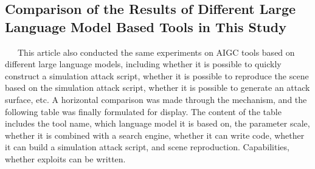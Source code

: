 \documentclass[runningheads]{llncs}
\begin{document}
\subsection{Comparison of the Results of Different Large Language Model Based Tools in This Study}
\ \ \ This article also conducted the same experiments on AIGC tools based on different large language models, including whether it is possible to quickly construct a simulation attack script, whether it is possible to reproduce the scene based on the simulation attack script, whether it is possible to generate an attack surface, etc. A horizontal comparison was made through the mechanism, and the following table was finally formulated for display. The content of the table includes the tool name, which language model it is based on, the parameter scale, whether it is combined with a search engine, whether it can write code, whether it can build a simulation attack script, and scene reproduction. Capabilities, whether exploits can be written.\par
%
\vspace{-1em} 
\end{document}
